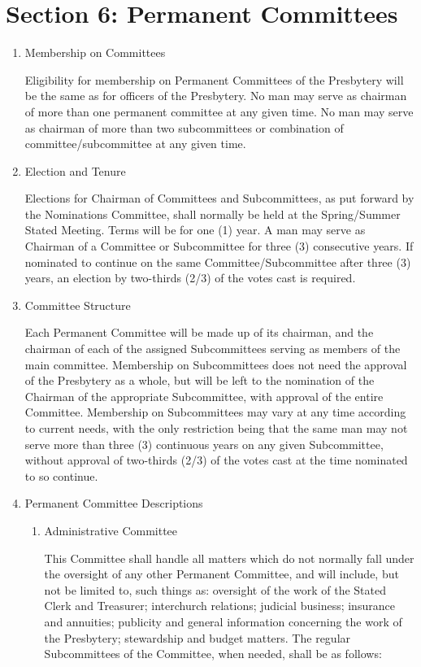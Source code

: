 \documentclass[
]{book}
\begin{document}
\hypertarget{section-6-permanent-committees}{%
\section{Section 6: Permanent Committees}\label{section-6-permanent-committees}}

\begin{enumerate}
\def\labelenumi{\Alph{enumi}.}
\item
  Membership on Committees

  Eligibility for membership on Permanent Committees of the Presbytery will be the same as for officers of the Presbytery. No man may serve as chairman of more than one permanent committee at any given time. No man may serve as chairman of more than two subcommittees or combination of committee/subcommittee at any given time.
\item
  Election and Tenure

  Elections for Chairman of Committees and Subcommittees, as put forward by the Nominations Committee, shall normally be held at the Spring/Summer Stated Meeting. Terms will be for one (1) year. A man may serve as Chairman of a Committee or Subcommittee for three (3) consecutive years. If nominated to continue on the same Committee/Subcommittee after three (3) years, an election by two-thirds (2/3) of the votes cast is required.
\item
  Committee Structure

  Each Permanent Committee will be made up of its chairman, and the chairman of each of the assigned Subcommittees serving as members of the main committee. Membership on Subcommittees does not need the approval of the Presbytery as a whole, but will be left to the nomination of the Chairman of the appropriate Subcommittee, with approval of the entire Committee. Membership on Subcommittees may vary at any time according to current needs, with the only restriction being that the same man may not serve more than three (3) continuous years on any given Subcommittee, without approval of two-thirds (2/3) of the votes cast at the time nominated to so continue.
\item
  Permanent Committee Descriptions

  \begin{enumerate}
  \def\labelenumii{\arabic{enumii}.}
  \item
    Administrative Committee

    This Committee shall handle all matters which do not normally fall under the oversight of any other Permanent Committee, and will include, but not be limited to, such things as: oversight of the work of the Stated Clerk and Treasurer; interchurch relations; judicial business; insurance and annuities; publicity and general information concerning the work of the Presbytery; stewardship and budget matters. The regular Subcommittees of the Committee, when needed, shall be as follows:


\end{enumerate}
\end{enumerate}
\end{document}
